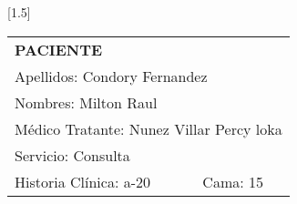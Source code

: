 \documentclass[10pt,a4paper]{article}
\begin{document}
 
\begin{minipage}{10cm}
\begin{flushleft}
\scalebox{1.4}[1.5]{
\begin{tabular}{|p{3cm}p{2.3cm}|}
\hline 
\multicolumn{2}{|l|}{\scriptsize{\textbf{PACIENTE}}}\\
\multicolumn{2}{|p{5.3cm}|}{\scriptsize{Apellidos: Condory Fernandez}}\\ 
\multicolumn{2}{|p{5.3cm}|}{\scriptsize{Nombres: Milton Raul}}\\ 
\multicolumn{2}{|p{5.3cm}|}{\scriptsize{M\'edico Tratante: Nunez Villar Percy loka}}\\ 
\hline 
\multicolumn{2}{|p{5.3cm}|}{\scriptsize{Servicio: Consulta}}\\
\hline 
\scriptsize{Historia Cl\'inica: a-20}&\scriptsize{Cama: 15} \\ 
\hline 
\end{tabular}}
\end{flushleft}
\end{minipage}
\end{document}
